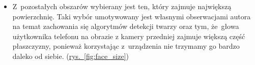 \begin{itemize}
    \item Z~pozostałych obszarów wybierany jest ten, który zajmuje największą powierzchnię. Taki wybór umotywowany jest własnymi obserwacjami autora na temat zachowania się algorytmów detekcji twarzy oraz tym, że~głowa użytkownika telefonu na obrazie z kamery przedniej zajmuje większą część płaszczyzny, ponieważ korzystając z~urządzenia nie trzymamy go bardzo daleko od siebie. (\hyperref[{fig:face_size}]{rys.~\ref{fig:face_size}})
    
    \begin{figure}[!h]
        \begin{center}
            \hspace{8mm}

\end{center}
\end{figure}
\end{itemize}
